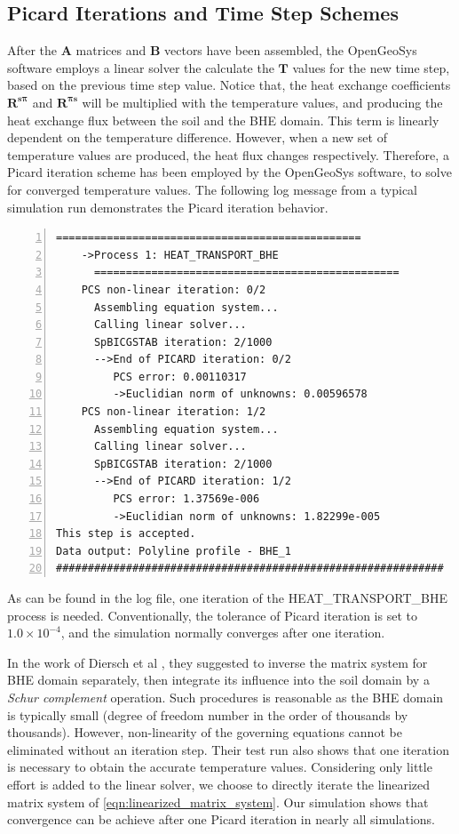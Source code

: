\subsection{Picard Iterations and Time Step Schemes}
After the $\bm{A}$ matrices and $\bm{B}$ vectors have been assembled, the OpenGeoSys software employs a linear solver the calculate the $\bm{T}$ values for the new time step, based on the previous time step value. Notice that, the heat exchange coefficients $\bm{R^{s \pi}}$ and $\bm{R^{\pi s}}$ will be multiplied with the temperature values, and producing the heat exchange flux between the soil and the BHE domain. This term is linearly dependent on the temperature difference. However, when a new set of temperature values are produced, the heat flux changes respectively. Therefore, a Picard iteration scheme has been employed by the OpenGeoSys software, to solve for converged temperature values. The following log message from a typical simulation run demonstrates the Picard iteration behavior. 
\begin{Verbatim}[gobble=0, 
                 frame=single, 
                 label=Log File of A Simulation Run, 
                 numbers=left]
      ================================================
    ->Process 1: HEAT_TRANSPORT_BHE
      ================================================
    PCS non-linear iteration: 0/2
      Assembling equation system...
      Calling linear solver...
	  SpBICGSTAB iteration: 2/1000 
      -->End of PICARD iteration: 0/2
         PCS error: 0.00110317
         ->Euclidian norm of unknowns: 0.00596578
    PCS non-linear iteration: 1/2
      Assembling equation system...
      Calling linear solver...
	  SpBICGSTAB iteration: 2/1000 
      -->End of PICARD iteration: 1/2
         PCS error: 1.37569e-006
         ->Euclidian norm of unknowns: 1.82299e-005
This step is accepted.
Data output: Polyline profile - BHE_1
#############################################################
\end{Verbatim}
As can be found in the log file, one iteration of the HEAT\_TRANSPORT\_BHE process is needed. Conventionally, the tolerance of Picard iteration is set to $1.0 \times 10^{-4}$, and the simulation normally converges after one iteration. 

In the work of Diersch et al \cite{Diersch2011a} \cite{FEFLOW2014}, they suggested to inverse the matrix system for BHE domain separately, then integrate its influence into the soil domain by a \textit{Schur complement} operation. Such procedures is reasonable as the BHE domain is typically small (degree of freedom number in the order of thousands by thousands). However, non-linearity of the governing equations cannot be eliminated without an iteration step. Their test run also shows that one iteration is necessary to obtain the accurate temperature values. Considering only little effort is added to the linear solver, we choose to directly iterate the linearized matrix system of \ref{eqn:linearized_matrix_system}. Our simulation shows that convergence can be achieve after one Picard iteration in nearly all simulations. 



